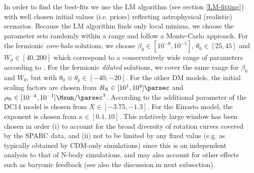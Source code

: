 In order to find the best-fits we use the LM algorithm (see section \ref{LM-fitting}) with well chosen initial values (i.e. priors) reflecting astrophysical (realistic) scenarios. Because the LM algorithm finds only local minima, we choose the parameter sets randomly within a range and follow a Monte-Carlo approach. For the fermionic \textit{core}-\textit{halo} solutions, we choose $\beta_0 \in [10^{-8},10^{-5}]$, $\theta_0\in [25,45]$ and $W_0\in[40,200]$ which correspond to a conservatively wide range of parameters according to \citet{2019PDU....24..278A}. For the fermionic \textit{diluted} solutions, we cover the same range for $\beta_0$ and $W_0$, but with $\theta_0\equiv\theta_p \in [-40,-20]$. For the other DM models, the initial scaling factors are chosen from $R_{\rm N}\in[10^{1}, 10^{4}]\si{\parsec}$ and $\rho_{\rm N} \in [10^{-4}, 10^{-1}]\si{\Msun\per\parsec^3}$. According to \citet{2017MNRAS.466.1648K} the additional parameter of the DC14 model is chosen from $X\in[-3.75,-1.3]$. For the Einasto model, the exponent is chosen from $\kappa\in[0.1, 10]$. This relatively large window has been chosen in order (i) to account for the broad diversity of rotation curves covered by the SPARC data, and (ii) not to be limited by any fixed value (e.g. as typically obtained by CDM-only simulations) since this is an independent analysis to that of N-body simulations, and may also account for other effects such as baryonic feedback (see also the discussion in next subsection).
